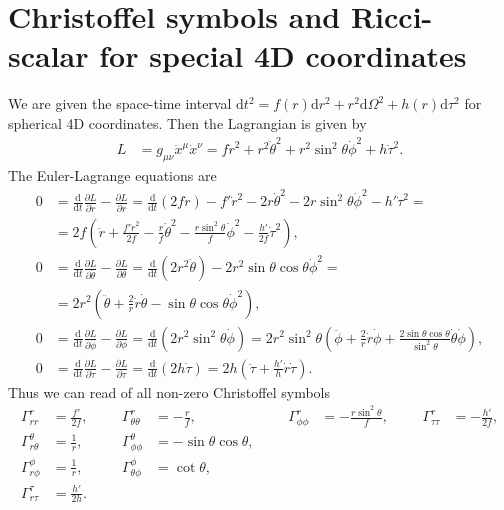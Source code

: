 \documentclass[english, parskip=full]{scrartcl}
\newcommand{\kla}{}
\newcommand{\tecxt}{}
\begin{document}
\section{Christoffel symbols and Ricci-scalar for special 4D coordinates}
We are given the space-time interval $\tecxt\text{d}t^2 = f(r) \tecxt\text{d}r^2 + r^2\tecxt\text{d}\Omega^2 + h(r)\tecxt\text{d}\tau^2$ for spherical 4D coordinates.
Then the Lagrangian is given by
\begin{align}
L &= g_{\mu\nu}\dot{x}^\mu \dot{x}^\nu = f\dot{r}^2 + r^2\dot{\theta}^2 + r^2\sin^2\theta \dot{\phi}^2 + h\dot{\tau}^2.
\end{align}
The Euler-Lagrange equations are
\begin{align}
0 &= \frac{\tecxt\text{d}}{\tecxt\text{d}t} \frac{\partial L}{\partial \dot{r}} - \frac{\partial L}{\partial r} = \frac{\tecxt\text{d}}{\tecxt\text{d}t} \kla\left( 2f\dot{r} \right) - f'\dot{r}^2 - 2r\dot{\theta}^2 - 2r\sin^2\theta \dot{\phi}^2 - h'\dot{\tau}^2 = \\
&= 2f\kla\left( \ddot{r} + \frac{f'\dot{r}^2}{2f} - \frac{r}{f}\dot{\theta}^2 - \frac{r\sin^2\theta}{f} \dot{\phi}^2 - \frac{h'}{2f} \dot{\tau}^2 \right),\\
0 &= \frac{\tecxt\text{d}}{\tecxt\text{d}t} \frac{\partial L}{\partial \dot{\theta}} - \frac{\partial L}{\partial \theta} =  \frac{\tecxt\text{d}}{\tecxt\text{d}t} \kla\left( 2r^2\dot{\theta} \right) - 2r^2\sin\theta\cos\theta \dot{\phi}^2 = \\
&= 2r^2 \kla\left( \ddot{\theta} + \frac{2}{r}\dot{r}\dot{\theta} - \sin\theta\cos\theta \dot{\phi}^2 \right),\\
0 &= \frac{\tecxt\text{d}}{\tecxt\text{d}t} \frac{\partial L}{\partial \dot{\phi}} - \frac{\partial L}{\partial \phi} =  \frac{\tecxt\text{d}}{\tecxt\text{d}t} \kla\left( 2r^2\sin^2\theta \dot{\phi} \right) =  2r^2\sin^2\theta \kla\left( \ddot{\phi} + \frac{2}{r}\dot{r}\dot{\phi} + \frac{2\sin\theta\cos\theta}{\sin^2\theta} \dot{\theta}\dot{\phi} \right),\\
0 &= \frac{\tecxt\text{d}}{\tecxt\text{d}t} \frac{\partial L}{\partial \dot{\tau}} - \frac{\partial L}{\partial \tau} = \frac{\tecxt\text{d}}{\tecxt\text{d}t} \kla\left( 2h\dot{\tau} \right) = 2h\kla\left( \ddot{\tau} + \frac{h'}{h} \dot{r}\dot{\tau} \right) .
\end{align}
Thus we can read of all non-zero Christoffel symbols
\begin{align}
\Gamma^r_{rr} &= \frac{f'}{2f}, &&& \Gamma^r_{\theta\theta} &= -\frac{r}{f}, &&& \Gamma^r_{\phi\phi} &= -\frac{r\sin^2\theta}{f}, &&& \Gamma^r_{\tau\tau} &= -\frac{h'}{2f}, \\
\Gamma^\theta_{r\theta} &= \frac{1}{r}, &&& \Gamma^\theta_{\phi\phi} &= -\sin\theta\cos\theta,\\
\Gamma^\phi_{r\phi} &= \frac{1}{r}, &&& \Gamma^\phi_{\theta\phi} &= \cot\theta,\\
\Gamma^\tau_{r\tau} &= \frac{h'}{2h}.
\end{align}
\end{document}

